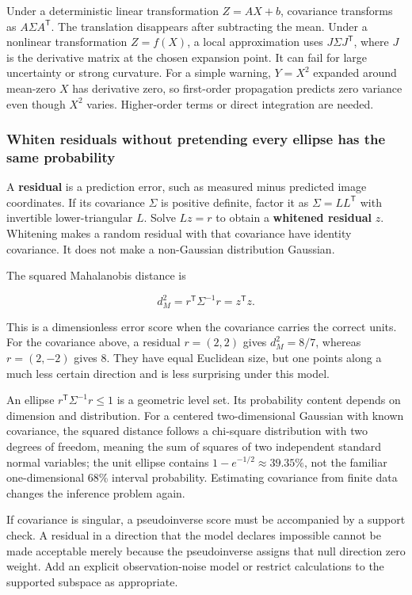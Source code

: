 Under a deterministic linear transformation \(Z=AX+b\), covariance transforms as \(A\Sigma A^{\mathsf T}\). The translation disappears after subtracting the mean. Under a nonlinear transformation \(Z=f(X)\), a local approximation uses \(J\Sigma J^{\mathsf T}\), where \(J\) is the derivative matrix at the chosen expansion point. It can fail for large uncertainty or strong curvature. For a simple warning, \(Y=X^2\) expanded around mean-zero \(X\) has derivative zero, so first-order propagation predicts zero variance even though \(X^2\) varies. Higher-order terms or direct integration are needed.

\subsubsection{Whiten residuals without pretending every ellipse has the same probability}\label{whiten-residuals-without-pretending-every-ellipse-has-the-same-probability}

A \textbf{residual} is a prediction error, such as measured minus predicted image coordinates. If its covariance \(\Sigma\) is positive definite, factor it as \(\Sigma=LL^{\mathsf T}\) with invertible lower-triangular \(L\). Solve \(Lz=r\) to obtain a \textbf{whitened residual} \(z\). Whitening makes a random residual with that covariance have identity covariance. It does not make a non-Gaussian distribution Gaussian.

The squared Mahalanobis distance is

\[
d_M^2=r^{\mathsf T}\Sigma^{-1}r=z^{\mathsf T}z.
\]

This is a dimensionless error score when the covariance carries the correct units. For the covariance above, a residual \(r=(2,2)\) gives \(d_M^2=8/7\), whereas \(r=(2,-2)\) gives \(8\). They have equal Euclidean size, but one points along a much less certain direction and is less surprising under this model.

An ellipse \(r^{\mathsf T}\Sigma^{-1}r\le1\) is a geometric level set. Its probability content depends on dimension and distribution. For a centered two-dimensional Gaussian with known covariance, the squared distance follows a chi-square distribution with two degrees of freedom, meaning the sum of squares of two independent standard normal variables; the unit ellipse contains \(1-e^{-1/2}\approx39.35\%\), not the familiar one-dimensional 68\% interval probability. Estimating covariance from finite data changes the inference problem again.

If covariance is singular, a pseudoinverse score must be accompanied by a support check. A residual in a direction that the model declares impossible cannot be made acceptable merely because the pseudoinverse assigns that null direction zero weight. Add an explicit observation-noise model or restrict calculations to the supported subspace as appropriate.

